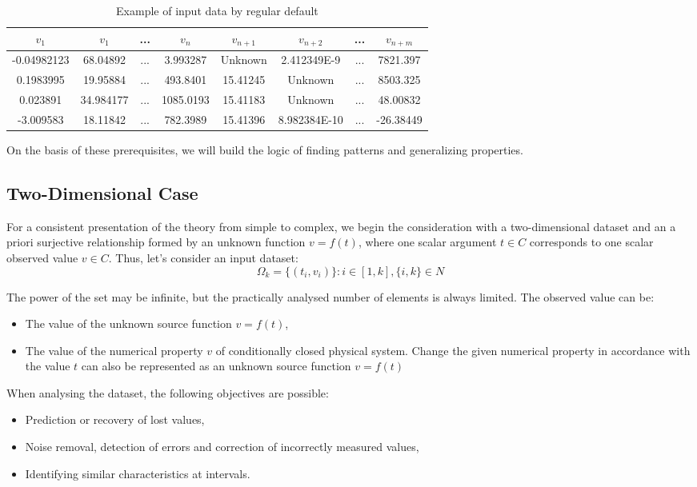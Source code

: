 \documentclass[a4paper, 11pt, oneside]{book}
\begin{document}
\begin{table}[h!]
  \centering
  \begin{tabular}{||c c c c c c c c||}
    \hline
    $v_1$ & $v_1$ & ... & $v_n$ & $v_{n + 1}$ & $v_{n + 2}$ & ... & $v_{n + m}$ \\ [0.5ex] 
    \hline
    -0.04982123 & 68.04892 & ... & 3.993287 & Unknown & 2.412349E-9 & ... & 7821.397 \\ 
    0.1983995 & 19.95884 & ... & 493.8401 & 15.41245 & Unknown & ... & 8503.325 \\
    0.023891 & 34.984177 & ... & 1085.0193 & 15.41183 & Unknown & ... & 48.00832 \\
    -3.009583 & 18.11842 & ... & 782.3989 & 15.41396 & 8.982384E-10 & ... & -26.38449 \\ [1ex] 
    \hline
  \end{tabular}
  \caption{Example of input data by regular default}
  \label{table:vi}
\end{table}

On the basis of these prerequisites, we will build the logic of finding patterns and generalizing properties.

\subsection{Two-Dimensional Case}\label{subs:trivial-case}
For a consistent presentation of the theory from simple to complex, we begin the consideration with a two-dimensional dataset and an a priori surjective relationship formed by an unknown function $v=f(t)$, where one scalar argument $t \in C$ corresponds to one scalar observed value $v \in C$. Thus, let's consider an input dataset:
\begin{equation}\label{eq:2-dim-dataset}
  \Omega_k = \{(t_i, v_i)\}: i \in [1, k], \{i, k\} \in N
\end{equation}

The power of the set may be infinite, but the practically analysed number of elements is always limited. The observed value can be:
\begin{itemize}
  \item The value of the unknown source function $v = f(t)$,
  \item The value of the numerical property $v$ of conditionally closed physical system. Change the given numerical property in accordance with the value $t$ can also be represented as an unknown source function $v = f(t)$
\end{itemize}
When analysing the dataset, the following objectives are possible:
\begin{itemize}
  \item Prediction or recovery of lost values,
  \item Noise removal, detection of errors and correction of incorrectly measured values,
  \item Identifying similar characteristics at intervals.
\end{itemize}
\end{document}
